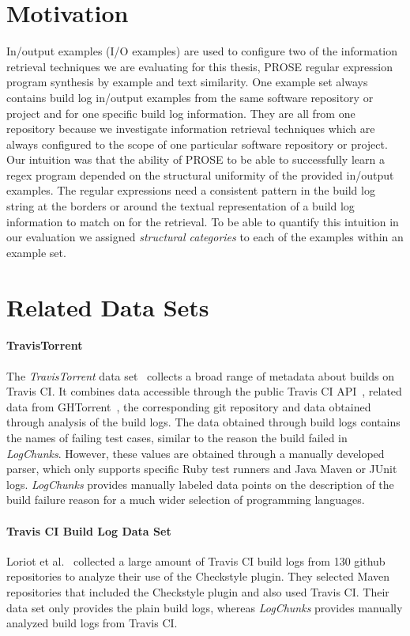 \documentclass[\myrootdir/main.tex]{subfiles}
\begin{document}
\section{Motivation}
In/output examples (I/O examples) are used to configure two of the information retrieval techniques we are evaluating for this thesis, PROSE regular expression program synthesis by example and text similarity.
One example set always contains build log in/output examples from the same software repository or project and for one specific build log information. They are all from one repository because we investigate information retrieval techniques which are always configured to the scope of one particular software repository or project.
Our intuition was that the ability of PROSE to be able to successfully learn a regex program depended on the structural uniformity of the provided in/output examples.
The regular expressions need a consistent pattern in the build log string at the borders or around the textual representation of a build log information to match on for the retrieval.
To be able to quantify this intuition in our evaluation we assigned \emph{structural categories} to each of the examples within an example set.

\section{Related Data Sets}

\paragraph{TravisTorrent}
The \emph{TravisTorrent} data set~\cite{beller2017travistorrent} collects a broad range of metadata about builds on Travis CI\@.
It combines data accessible through the public Travis CI API~\cite{travisci2019apidoc}, related data from GHTorrent~\cite{gousios2013ghtorrent}, the corresponding git repository and data obtained through analysis of the build logs.
The data obtained through build logs contains the names of failing test cases, similar to the reason the build failed in \emph{LogChunks}.
However, these values are obtained through a manually developed parser, which only supports specific Ruby test runners and Java Maven or JUnit logs.
\emph{LogChunks} provides manually labeled data points on the description of the build failure reason for a much wider selection of programming languages.

\paragraph{Travis CI Build Log Data Set}
Loriot et al.~\cite{loriot2019dataset, loriot2019styler} collected a large amount of Travis CI build logs from 130 github repositories to analyze their use of the Checkstyle plugin.
They selected Maven repositories that included the Checkstyle plugin and also used Travis CI\@.
Their data set only provides the plain build logs, whereas \emph{LogChunks} provides manually analyzed build logs from Travis CI\@.
\end{document}
